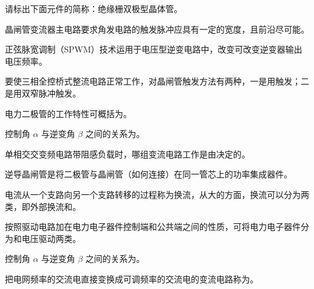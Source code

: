 \documentclass[电力电子]{subfiles}
\begin{document}
\begin{ti}
	请标出下面元件的简称：绝缘栅双极型晶体管。
\end{ti}

\begin{ti}
	晶闸管变流器主电路要求角发电路的触发脉冲应具有一定的宽度，且前沿尽可能。
\end{ti}

\begin{ti}
	正弦脉宽调制（SPWM）技术运用于电压型逆变电路中，改变可改变逆变器输出电压频率。
\end{ti}

\begin{ti}
	要使三相全控桥式整流电路正常工作，对晶闸管触发方法有两种，一是用触发；二是用双窄脉冲触发。
\end{ti}

\begin{ti}
	电力二极管的工作特性可概括为。
\end{ti}

\begin{ti}
	控制角 $\alpha$ 与逆变角 $\beta$ 之间的关系为\hua{$\beta = \uppi - \alpha$}。
\end{ti}

\begin{ti}
	单相交交变频电路带阻感负载时，哪组变流电路工作是由决定的。
\end{ti}

\begin{ti}
	逆导晶闸管是将二极管与晶闸管（如何连接）在同一管芯上的功率集成器件。
\end{ti}

\begin{ti}
	电流从一个支路向另一个支路转移的过程称为换流，从大的方面，换流可以分为两类，即外部换流和。
\end{ti}

\begin{ti}
	按照驱动电路加在电力电子器件控制端和公共端之间的性质，可将电力电子器件分为和电压驱动两类。
\end{ti}

\begin{ti}
	控制角 $\alpha$ 与逆变角 $\beta$ 之间的关系为\hua{$\beta = \uppi - \alpha$}。
\end{ti}

\begin{ti}
	把电网频率的交流电直接变换成可调频率的交流电的变流电路称为。
\end{ti}
\end{document}
